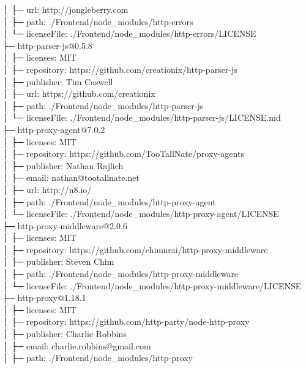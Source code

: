 \documentclass[
    paper=a4,
    twoside=false,
    parskip=half,
    listof=entryprefix,
    listof=totoc,
    index=totoc,
    bibliography=totoc,
    headsepline,
]{scrbook}
\begin{document}
    │  ├─ url: http://jongleberry.com\\
    │  ├─ path: ./Frontend/node\_modules/http-errors\\
    │  └─ licenseFile: ./Frontend/node\_modules/http-errors/LICENSE\\
    ├─ http-parser-js@0.5.8\\
    │  ├─ licenses: MIT\\
    │  ├─ repository: https://github.com/creationix/http-parser-js\\
    │  ├─ publisher: Tim Caswell\\
    │  ├─ url: https://github.com/creationix\\
    │  ├─ path: ./Frontend/node\_modules/http-parser-js\\
    │  └─ licenseFile: ./Frontend/node\_modules/http-parser-js/LICENSE.md\\
    ├─ http-proxy-agent@7.0.2\\
    │  ├─ licenses: MIT\\
    │  ├─ repository: https://github.com/TooTallNate/proxy-agents\\
    │  ├─ publisher: Nathan Rajlich\\
    │  ├─ email: nathan@tootallnate.net\\
    │  ├─ url: http://n8.io/\\
    │  ├─ path: ./Frontend/node\_modules/http-proxy-agent\\
    │  └─ licenseFile: ./Frontend/node\_modules/http-proxy-agent/LICENSE\\
    ├─ http-proxy-middleware@2.0.6\\
    │  ├─ licenses: MIT\\
    │  ├─ repository: https://github.com/chimurai/http-proxy-middleware\\
    │  ├─ publisher: Steven Chim\\
    │  ├─ path: ./Frontend/node\_modules/http-proxy-middleware\\
    │  └─ licenseFile: ./Frontend/node\_modules/http-proxy-middleware/LICENSE\\
    ├─ http-proxy@1.18.1\\
    │  ├─ licenses: MIT\\
    │  ├─ repository: https://github.com/http-party/node-http-proxy\\
    │  ├─ publisher: Charlie Robbins\\
    │  ├─ email: charlie.robbins@gmail.com\\
    │  ├─ path: ./Frontend/node\_modules/http-proxy\\
\end{document}
